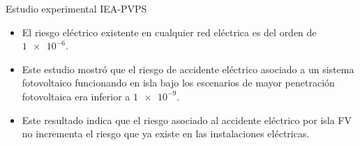 \documentclass[xcolor={usenames,svgnames,dvipsnames}]{beamer}
\begin{document}
\begin{frame}[label={sec:orgf75bb81}]{Estudio experimental IEA-PVPS}
\begin{itemize}
\item El riesgo eléctrico existente en cualquier red eléctrica es del orden
de \(\num{1e-6}\).

\item Este estudio mostró que el riesgo de accidente eléctrico asociado a
un sistema fotovoltaico funcionando en isla bajo los escenarios de
mayor penetración fotovoltaica era inferior a \(\num{1e-9}\).

\item Este resultado indica que el riesgo asociado al accidente eléctrico
por isla FV no incrementa el riesgo que ya existe en las
instalaciones eléctricas.
\end{itemize}
\end{frame}
\end{document}
